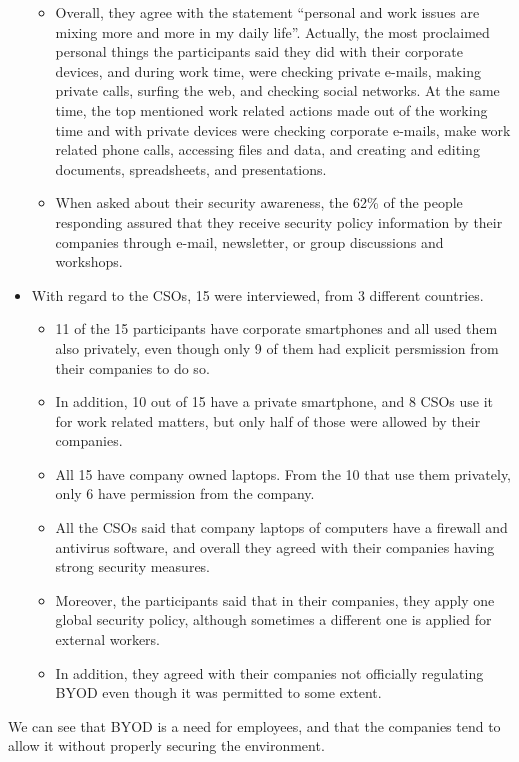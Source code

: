 \begin{itemize}
\begin{itemize}
		\item Overall, they agree with the statement ``personal and work issues are mixing more and more in my daily life''. Actually, the most proclaimed personal things the participants said they did with their corporate devices, and during work time, were checking private e-mails, making private calls, surfing the web, and checking social networks. At the same time, the top mentioned work related actions made out of the working time and with private devices were checking corporate e-mails, make work related phone calls, accessing files and data, and creating and editing documents, spreadsheets, and presentations.
		\item When asked about their security awareness, the 62\% of the people responding assured that they receive security policy information by their companies through e-mail, newsletter, or group discussions and workshops.
	\end{itemize}
	\item With regard to the CSOs, 15 were interviewed, from 3 different countries.
	\begin{itemize}
		\item 11 of the 15 participants have corporate smartphones and all used them also privately, even though only 9 of them had explicit persmission from their companies to do so.
		\item In addition, 10 out of 15 have a private smartphone, and 8 CSOs use it for work related matters, but only half of those were allowed by their companies.
		\item All 15 have company owned laptops. From the 10 that use them privately, only 6 have permission from the company.
		\item All the CSOs said that company laptops of computers have a firewall and antivirus software, and overall they agreed with their companies having strong security measures.
		\item Moreover, the participants said that in their companies, they apply one global security policy, although sometimes a different one is applied for external workers.
		\item In addition, they agreed with their companies not officially regulating BYOD even though it was permitted to some extent.
	\end{itemize}
\end{itemize}

We can see that BYOD is a need for employees, and that the companies tend to allow it without properly securing the environment.

